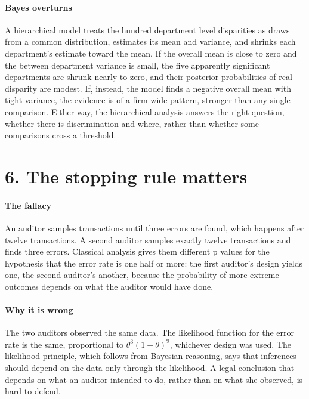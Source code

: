 \paragraph{Bayes overturns} A hierarchical model treats the hundred department level disparities as draws from a common distribution, estimates its mean and variance, and shrinks each department's estimate toward the mean. If the overall mean is close to zero and the between department variance is small, the five apparently significant departments are shrunk nearly to zero, and their posterior probabilities of real disparity are modest. If, instead, the model finds a negative overall mean with tight variance, the evidence is of a firm wide pattern, stronger than any single comparison. Either way, the hierarchical analysis answers the right question, whether there is discrimination and where, rather than whether some comparisons cross a threshold.

\section{6. The stopping rule matters}

\paragraph{The fallacy} An auditor samples transactions until three errors are found, which happens after twelve transactions. A second auditor samples exactly twelve transactions and finds three errors. Classical analysis gives them different p values for the hypothesis that the error rate is one half or more: the first auditor's design yields one, the second auditor's another, because the probability of more extreme outcomes depends on what the auditor would have done.

\paragraph{Why it is wrong} The two auditors observed the same data. The likelihood function for the error rate is the same, proportional to $\theta^3(1-\theta)^9$, whichever design was used. The likelihood principle, which follows from Bayesian reasoning, says that inferences should depend on the data only through the likelihood. A legal conclusion that depends on what an auditor intended to do, rather than on what she observed, is hard to defend.

